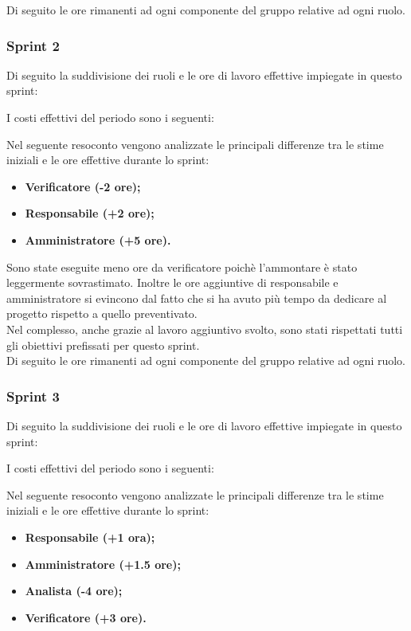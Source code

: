 Di seguito le ore rimanenti ad ogni componente del gruppo relative ad ogni ruolo.



\subsubsection{Sprint 2}
Di seguito la suddivisione dei ruoli e le ore di lavoro effettive impiegate in questo sprint:



I costi effettivi del periodo sono i seguenti:



Nel seguente resoconto vengono analizzate le principali differenze tra le stime iniziali e le ore effettive durante lo sprint:
\begin{itemize}
    \item \textbf{Verificatore (-2 ore);} 
    \item \textbf{Responsabile (+2 ore);} 
    \item \textbf{Amministratore (+5 ore).}
\end{itemize}
Sono state eseguite meno ore da verificatore poichè l'ammontare è stato leggermente sovrastimato. Inoltre le ore aggiuntive di responsabile e amministratore si evincono dal fatto che si ha avuto più tempo da dedicare al progetto rispetto
a quello preventivato.
\\
Nel complesso, anche grazie al lavoro aggiuntivo svolto, sono stati rispettati tutti gli obiettivi prefissati per questo sprint.\\

Di seguito le ore rimanenti ad ogni componente del gruppo relative ad ogni ruolo.




\subsubsection{Sprint 3}
Di seguito la suddivisione dei ruoli e le ore di lavoro effettive impiegate in questo sprint:



I costi effettivi del periodo sono i seguenti:



Nel seguente resoconto vengono analizzate le principali differenze tra le stime iniziali e le ore effettive durante lo sprint:
\begin{itemize}
    \item \textbf{Responsabile (+1 ora);} 
    \item \textbf{Amministratore (+1.5 ore);} 
    \item \textbf{Analista (-4 ore);}
    \item \textbf{Verificatore (+3 ore).}
\end{itemize}

